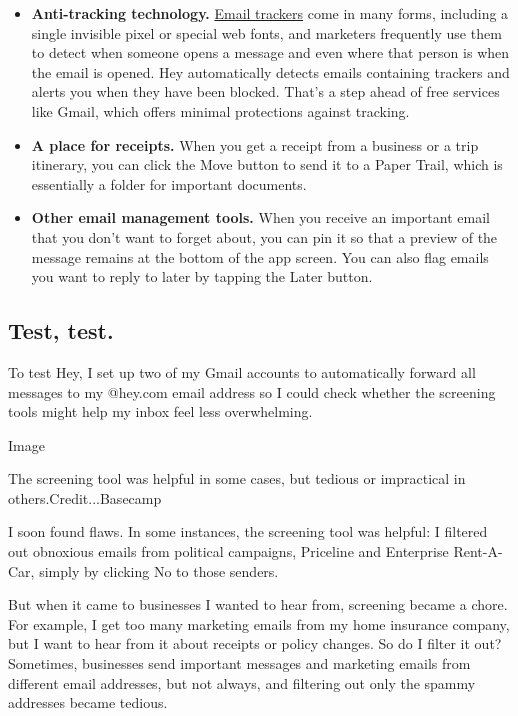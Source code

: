 \begin{itemize}
\item
  \textbf{Anti-tracking technology.}
  \href{https://hey.com/spy-trackers/}{Email trackers} come in many
  forms, including a single invisible pixel or special web fonts, and
  marketers frequently use them to detect when someone opens a message
  and even where that person is when the email is opened. Hey
  automatically detects emails containing trackers and alerts you when
  they have been blocked. That's a step ahead of free services like
  Gmail, which offers minimal protections against tracking.
\item
  \textbf{A place for receipts.} When you get a receipt from a business
  or a trip itinerary, you can click the Move button to send it to a
  Paper Trail, which is essentially a folder for important documents.
\item
  \textbf{Other email management tools.} When you receive an important
  email that you don't want to forget about, you can pin it so that a
  preview of the message remains at the bottom of the app screen. You
  can also flag emails you want to reply to later by tapping the Later
  button.
\end{itemize}

\hypertarget{test-test}{%
\subsection{Test, test.}\label{test-test}}

To test Hey, I set up two of my Gmail accounts to automatically forward
all messages to my @hey.com email address so I could check whether the
screening tools might help my inbox feel less overwhelming.

Image

The screening tool was helpful in some cases, but tedious or impractical
in others.Credit...Basecamp

I soon found flaws. In some instances, the screening tool was helpful: I
filtered out obnoxious emails from political campaigns, Priceline and
Enterprise Rent-A-Car, simply by clicking No to those senders.

But when it came to businesses I wanted to hear from, screening became a
chore. For example, I get too many marketing emails from my home
insurance company, but I want to hear from it about receipts or policy
changes. So do I filter it out? Sometimes, businesses send important
messages and marketing emails from different email addresses, but not
always, and filtering out only the spammy addresses became tedious.

